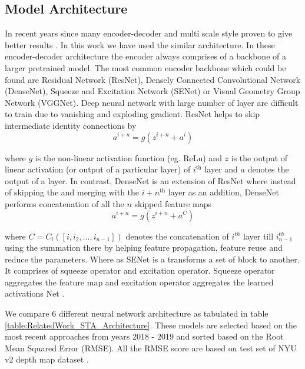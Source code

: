 \subsection{Model Architecture}
\label{Chapter3:ModelArch}
In recent years since many encoder-decoder and multi scale style proven to give better results \cite{Alhashim2018, hu2019revisiting}. In this work we have used the similar architecture. In these encoder-decoder architecture the encoder always comprises of a backbone of a larger pretrained model. The most common encoder backbone which could be found are Residual Network (ResNet), Densely Connected Convolutional Network (DenseNet), Squeeze and Excitation Network (SENet) or Visual Geometry Group Network (VGGNet)\cite{hu2019revisiting}. Deep neural network with large number of layer are difficult to train due to vanishing and exploding gradient. ResNet helps to skip intermediate identity connections by 
\begin{equation} \label{eqResNet}
    {a^{i+n}=g(z^{i+n} + a^i)}
\end{equation}


where \(g\) is the non-linear activation function (eg. ReLu) and \(z\) is the output of linear activation (or output of a particular layer) of $i^{\text{th}}$ layer and \(a\) denotes the output of a layer. In contrast, DenseNet is an extension of ResNet where instead of skipping the and merging with the $i+n^{\text{th}}$ layer as an addition, DenseNet performs concatenation of all the $n$ skipped feature maps
\begin{equation} \label{eqDenseNet}
    {a^{i+n}=g(z^{i+n} + a^{C})}
\end{equation}


where \({C =C_i([i,i_2,...,i_{n-1}])}\) denotes the concatenation of \(i^{th}\) layer till \(i_{n-1}^{th}\) using the summation \cite{huang2017densely} there by helping feature propagation, feature reuse and  reduce the parameters. Where as SENet is a transforms a set of block to another. It comprises of squeeze operator and excitation operator. Squeeze operator aggregates the feature map and excitation operator  aggregates the learned activations Net \cite{iandola2016squeezenet}. 


We compare 6 different neural network architecture as tabulated in table \ref{table:RelatedWork_STA_Architecture}. These models are selected based on the most recent approaches from years  2018 - 2019 and sorted based on the Root Mean Squared Error (RMSE). All the RMSE score are based on test set of NYU v2 depth map dataset \cite{silberman11indoor}.

